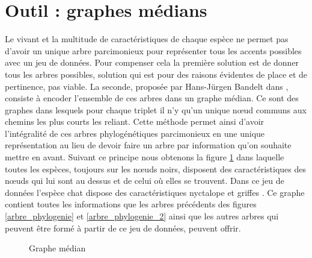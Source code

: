 \section{Outil : graphes médians}

Le vivant et la multitude de caractéristiques de chaque espèce ne permet pas d'avoir un unique arbre parcimonieux pour représenter tous les accents possibles avec un jeu de données. Pour compenser cela la première solution est de donner tous les arbres possibles, solution qui est pour des raisons évidentes de place et de pertinence, pas viable. La seconde, proposée par Hans-Jürgen Bandelt dans \cite{MedianAlgebras}, consiste à encoder l'ensemble de ces arbres dans un graphe médian. Ce sont des graphes dans lesquels pour chaque triplet il n'y qu'un unique n\oe ud communs aux chemins les plus courts les reliant. Cette méthode permet ainsi d'avoir l'intégralité de ces arbres phylogénétiques parcimonieux en une unique représentation au lieu de devoir faire un arbre par information qu'on souhaite mettre en avant. Suivant ce principe nous obtenons la figure \ref{graphe_median_phylogenie} dans laquelle toutes les espèces, toujours sur les n\oe uds noirs, disposent des caractéristiques des n\oe uds qui lui sont au dessus et de celui où elles se trouvent. Dans ce jeu de données l'espèce \guillemotleft{} chat \guillemotright{} dispose des caractéristiques \guillemotleft{} nyctalope \guillemotright{} et \guillemotleft{} griffes \guillemotright{}. Ce graphe contient toutes les informations que les arbres précédents des figures \ref{arbre_phylogenie} et \ref{arbre_phylogenie_2} ainsi que les autres arbres qui peuvent être formé à partir de ce jeu de données, peuvent offrir.

\begin{figure}[H]
	\begin{center}
	\end{center}
	\caption{Graphe médian}
	\label{graphe_median_phylogenie}
\end{figure}

